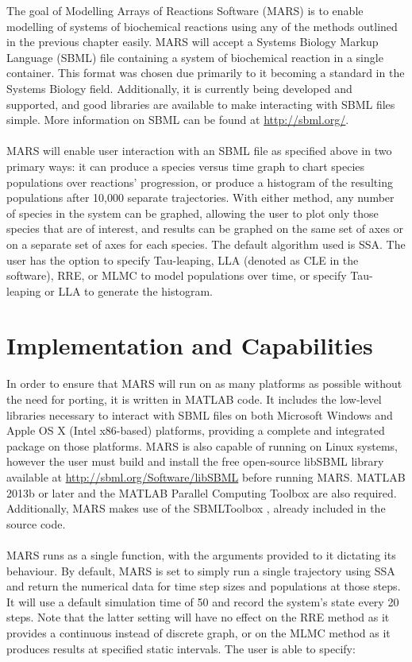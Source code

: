 \documentclass[ugrad,lot,lof,openright,11pt,oneside,onehalfspace]{RUthesis}
\begin{document}
		The goal of Modelling Arrays of Reactions Software (MARS) is to enable modelling of systems of biochemical reactions using any of the methods outlined in the previous chapter easily. MARS will accept a Systems Biology Markup Language (SBML) file containing a system of biochemical reaction in a single container. This format was chosen due primarily to it becoming a standard in the Systems Biology field. Additionally, it is currently being developed and supported, and good libraries are available to make interacting with SBML files simple. More information on SBML can be found at \url{http://sbml.org/}.\\
		\\
		MARS will enable user interaction with an SBML file as specified above in two primary ways: it can produce a species versus time graph to chart species populations over reactions' progression, or produce a histogram of the resulting populations after 10,000 separate trajectories. With either method, any number of species in the system can be graphed, allowing the user to plot only those species that are of interest, and results can be graphed on the same set of axes or on a separate set of axes for each species. The default algorithm used is SSA. The user has the option to specify Tau-leaping, LLA (denoted as CLE in the software), RRE, or MLMC to model populations over time, or specify Tau-leaping or LLA to generate the histogram.


	\section{Implementation and Capabilities}

		In order to ensure that MARS will run on as many platforms as possible without the need for porting, it is written in MATLAB code. It includes the low-level libraries necessary to interact with SBML files on both Microsoft Windows and Apple OS X (Intel x86-based) platforms, providing a complete and integrated package on those platforms. MARS is also capable of running on Linux systems, however the user must build and install the free open-source libSBML library available at \url{http://sbml.org/Software/libSBML} \cite{libsbml} before running MARS. MATLAB 2013b or later and the MATLAB Parallel Computing Toolbox are also required. Additionally, MARS makes use of the SBMLToolbox \cite{sbml_toolbox}, already included in the source code.\\
		\\
		MARS runs as a single function, with the arguments provided to it dictating its behaviour. By default, MARS is set to simply run a single trajectory using SSA and return the numerical data for time step sizes and populations at those steps. It will use a default simulation time of 50 and record the system's state every 20 steps. Note that the latter setting will have no effect on the RRE method as it provides a continuous instead of discrete graph, or on the MLMC method as it produces results at specified static intervals. The user is able to specify:
\end{document}
